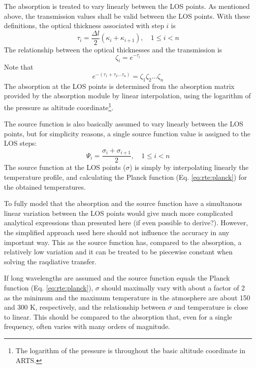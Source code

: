   \label{sec:rte:abs}
  
  The absorption is treated to vary linearly between the LOS points.
  As mentioned above, the transmission values shall be valid between the
  LOS points. With these definitions, the optical thickness associated with 
  step $i$ is
 \begin{equation}
    \tau_i = \frac{\Delta l}{2} \left( \kappa_i+\kappa_{i+1} \right),
                             \quad 1\leq i < n 
  \label{eq:rte:tau}
 \end{equation}
 The relationship between the optical thicknesses and
 the transmission is
 \begin{equation}
   \zeta_i = e^{-\tau_i}
 \end{equation}
 Note that
 \begin{equation}
   e^{-\left(\tau_1+\tau_2\dots\tau_n\right)}=\zeta_1\zeta_2\dots\zeta_n
 \end{equation}
 The absorption at the LOS points is determined from the absorption
 matrix provided by the absorption module by linear interpolation,
 using the logarithm of the pressure as altitude
 coordinate\footnote{The logarithm of the pressure is throughout the
   basic altitude coordinate in ARTS.}.


  \label{sec:rte:source}
  The source function is also basically assumed to vary linearly
  between the LOS points, but for simplicity reasons, a single
  source function value is assigned to the LOS steps:
  \begin{equation}
    \Psi_i = \frac{\sigma_i+\sigma_{i+1}}{2}, \quad 1\leq i < n
   \label{eq:rte:smean}
  \end{equation}   
  The source function at the LOS points ($\sigma$) is simply by
  interpolating linearly the temperature profile, and calculating the
  Planck function (Eq. \ref{eq:rte:planck}) for the obtained
  temperatures.
  
  To fully model that the absorption and the source function have a
  simultanous linear variation between the LOS points would give much
  more complicated analytical expressions than presented here (if even
  possible to derive?). However, the simplified approach used here
  should not influence the accuracy in any important way. This as the
  source function has, compared to the absorption, a relatively low
  variation and it can be treated to be piecewise constant when solving
  the raqdiative transfer.
  
  If long wavelengths are assumed and the source function equals the
  Planck function (Eq.  \ref{eq:rte:planck}), $\sigma$ should
  maximally vary with about a factor of 2 as the minimum and the
  maximum temperature in the atmosphere are about 150 and 300 K,
  respectively, and the relationship between $\sigma$ and temperature
  is close to linear.  This should be compared to the absorption that,
  even for a single frequency, often varies with many orders of
  magnitude.


